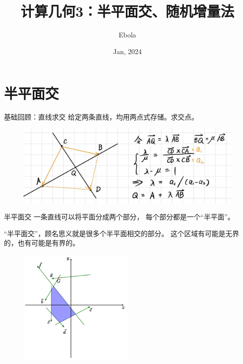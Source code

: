 \documentclass{beamer}
\author{Ebola}
\title{计算几何3：半平面交、随机增量法}
\institute{
    Institute of Mathematics, \\
    Zhejiang University.
}
\date{Jan, 2024}
\begin{document}
\begin{frame}
    \titlepage
\end{frame}

\begin{frame}
    \tableofcontents[sectionstyle=show,subsectionstyle=show/shaded/hide,subsubsectionstyle=show/shaded/hide]
\end{frame}

\section{半平面交}

\begin{frame}{基础回顾：直线求交}
    \small
    给定两条直线，均用两点式存储。求交点。

    \vspace{1em}\pause
    \begin{figure}[H]
        \centering
        \includegraphics[width=\textwidth]{pic/lineinsect.jpg}
    \end{figure}
\end{frame}

\begin{frame}{半平面交}
    \small
    一条直线可以将平面分成两个部分，
    每个部分都是一个“半平面”。

    \vspace{1em}
    “半平面交”，顾名思义就是很多个半平面相交的部分。
    这个区域有可能是无界的，也有可能是有界的。

    \begin{figure}[H]
        \centering
        \includegraphics[width=0.5\textwidth]{pic/halfplane_2.png}
    \end{figure}
\end{frame}
\end{document}
